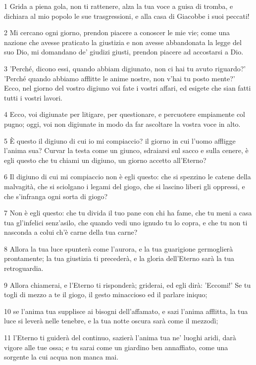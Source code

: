\par 1 Grida a piena gola, non ti rattenere, alza la tua voce a guisa di tromba, e dichiara al mio popolo le sue trasgressioni, e alla casa di Giacobbe i suoi peccati!
\par 2 Mi cercano ogni giorno, prendon piacere a conoscer le mie vie; come una nazione che avesse praticato la giustizia e non avesse abbandonata la legge del suo Dio, mi domandano de' giudizi giusti, prendon piacere ad accostarsi a Dio.
\par 3 'Perché, dicono essi, quando abbiam digiunato, non ci hai tu avuto riguardo?' 'Perché quando abbiamo afflitte le anime nostre, non v'hai tu posto mente?' Ecco, nel giorno del vostro digiuno voi fate i vostri affari, ed esigete che sian fatti tutti i vostri lavori.
\par 4 Ecco, voi digiunate per litigare, per questionare, e percuotere empiamente col pugno; oggi, voi non digiunate in modo da far ascoltare la vostra voce in alto.
\par 5 È questo il digiuno di cui io mi compiaccio? il giorno in cui l'uomo affligge l'anima sua? Curvar la testa come un giunco, sdraiarsi sul sacco e sulla cenere, è egli questo che tu chiami un digiuno, un giorno accetto all'Eterno?
\par 6 Il digiuno di cui mi compiaccio non è egli questo: che si spezzino le catene della malvagità, che si sciolgano i legami del giogo, che si lascino liberi gli oppressi, e che s'infranga ogni sorta di giogo?
\par 7 Non è egli questo: che tu divida il tuo pane con chi ha fame, che tu meni a casa tua gl'infelici senz'asilo, che quando vedi uno ignudo tu lo copra, e che tu non ti nasconda a colui ch'è carne della tua carne?
\par 8 Allora la tua luce spunterà come l'aurora, e la tua guarigione germoglierà prontamente; la tua giustizia ti precederà, e la gloria dell'Eterno sarà la tua retroguardia.
\par 9 Allora chiamerai, e l'Eterno ti risponderà; griderai, ed egli dirà: 'Eccomi!' Se tu togli di mezzo a te il giogo, il gesto minaccioso ed il parlare iniquo;
\par 10 se l'anima tua supplisce ai bisogni dell'affamato, e sazi l'anima afflitta, la tua luce si leverà nelle tenebre, e la tua notte oscura sarà come il mezzodì;
\par 11 l'Eterno ti guiderà del continuo, sazierà l'anima tua ne' luoghi aridi, darà vigore alle tue ossa; e tu sarai come un giardino ben annaffiato, come una sorgente la cui acqua non manca mai.
